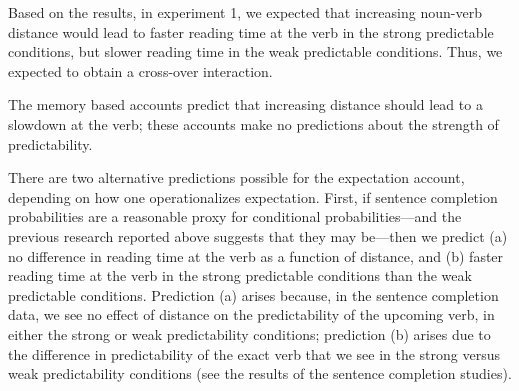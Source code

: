 \documentclass{frontiersSCNS}\usepackage{knitr} %
\begin{document}
Based on the \citet{husain2014strong} results, 
in experiment 1, 
we expected that increasing noun-verb distance would lead to faster reading time at the verb in the strong predictable conditions, but slower reading time in the weak predictable conditions. Thus, we expected to obtain a cross-over interaction. 

The memory based accounts \citep{just1992ctc,gibson2000dependency,lewis2005activation} predict that increasing distance should lead to a slowdown at the verb; these accounts make no predictions about  the strength of predictability.

There are two alternative predictions possible for the expectation account, depending on how one operationalizes expectation. First, if sentence completion probabilities are a reasonable proxy for conditional probabilities---and the previous research reported above \citep{husain2014strong,levy2013expectation,Jaegeretal2015} suggests that they may be---then we predict (a) no difference in reading time at the verb as a function of distance, and (b) faster reading time at the verb in the strong predictable conditions than the weak predictable conditions. Prediction (a) arises because, in the sentence completion data, we see no effect of distance on the predictability of the upcoming verb, in either the strong or weak predictability conditions; prediction (b) arises due to the difference in predictability of the exact verb that we see in the strong versus weak predictability conditions (see the results of the sentence completion studies).
\end{document}
